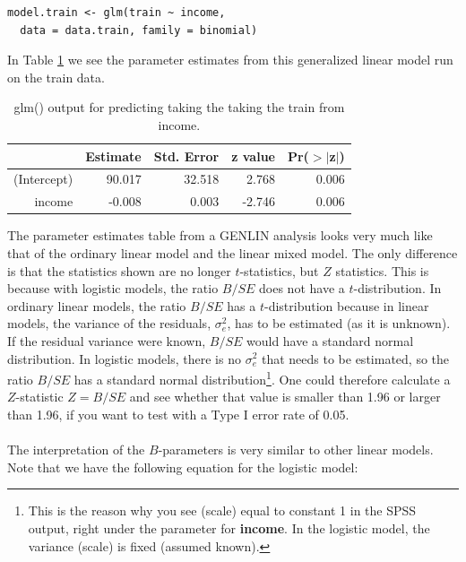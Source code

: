 \documentclass[]{book}\usepackage[]{graphicx}\usepackage[]{color}
\begin{document}
\begin{lstlisting}
model.train <- glm(train ~ income, 
  data = data.train, family = binomial)
\end{lstlisting}


In Table \ref{tab:out_train_r} we see the parameter estimates from this generalized linear model run on the train data.


\begin{table}[ht]
\centering
\caption{glm() output for predicting taking the taking the train from income.} 
\label{tab:out_train_r}
\begin{tabular}{rrrrr}
  \hline
 & Estimate & Std. Error & z value & Pr($>$$|$z$|$) \\ 
  \hline
(Intercept) & 90.017 & 32.518 & 2.768 & 0.006 \\ 
  income & -0.008 & 0.003 & -2.746 & 0.006 \\ 
   \hline
\end{tabular}
\end{table}




The parameter estimates table from a GENLIN analysis looks very much like that of the ordinary linear model and the linear mixed model. The only difference is that the statistics shown are no longer $t$-statistics, but $Z$ statistics. This is because with logistic models, the ratio $B/SE$ does not have a $t$-distribution. In ordinary linear models, the ratio $B/SE$ has a $t$-distribution because in linear models, the variance of the residuals, $\sigma^2_e$, has to be estimated (as it is unknown). If the residual variance were known, $B/SE$ would have a standard normal distribution. In logistic models, there is no $\sigma^2_e$ that needs to be estimated, so the ratio $B/SE$ has a standard normal distribution\footnote{This is the reason why you see (scale) equal to constant 1 in the SPSS output, right under the parameter for \textbf{income}. In the logistic model, the variance (scale) is fixed (assumed known).}. One could therefore calculate a $Z$-statistic $Z=B/SE$ and see whether that value is smaller than 1.96 or larger than 1.96, if you want to test with a Type I error rate of 0.05. 
\\
\\
The interpretation of the $B$-parameters is very similar to other linear models. Note that we have the following equation for the logistic model:
\end{document}

